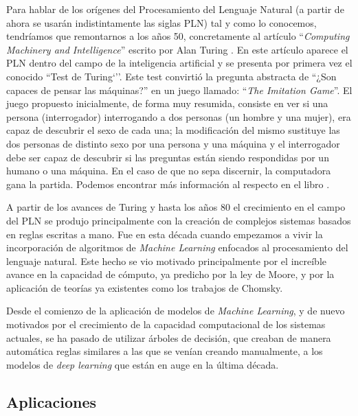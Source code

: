 Para hablar de los orígenes del Procesamiento del Lenguaje Natural (a partir de ahora se usarán indistintamente las siglas PLN) tal y como lo conocemos, tendríamos que remontarnos a los años 50, concretamente al artículo ``\textit{Computing Machinery and Intelligence}'' escrito por Alan Turing \cite{turing_1950}. En este artículo aparece el PLN dentro del campo de la inteligencia artificial y se presenta por primera vez el conocido ``Test de Turing`''. Este test convirtió la pregunta abstracta de ``¿Son capaces de pensar las máquinas?'' en un juego llamado: ``\textit{The Imitation Game}''. El juego propuesto inicialmente, de forma muy resumida, consiste en ver si una persona (interrogador) interrogando a dos personas (un hombre y una mujer), era capaz de descubrir el sexo de cada una; la modificación del mismo sustituye las dos personas de distinto sexo por una persona y una máquina y el interrogador debe ser capaz de descubrir si las preguntas están siendo respondidas por un humano o una máquina. En el caso de que no sepa discernir, la computadora gana la partida. Podemos encontrar más información al respecto en el libro \cite{turing}.



A partir de los avances de Turing y hasta los años 80 el crecimiento en el campo del PLN se produjo principalmente con la creación de complejos sistemas basados en reglas escritas a mano. Fue en esta década cuando empezamos a vivir la incorporación de algoritmos de \textit{Machine Learning} enfocados al procesamiento del lenguaje natural. Este hecho se vio motivado principalmente por el increíble avance en la capacidad de cómputo, ya predicho por la ley de Moore, y por la aplicación de teorías ya existentes como los trabajos de Chomsky. 


Desde el comienzo de la aplicación de modelos de \textit{Machine Learning}, y de nuevo motivados por el crecimiento de la capacidad computacional de los sistemas actuales, se ha pasado de utilizar árboles de decisión, que creaban de manera automática reglas similares a las que se venían creando manualmente, a los modelos de \textit{deep learning} que están en auge en la última década. 

\subsection{Aplicaciones}

